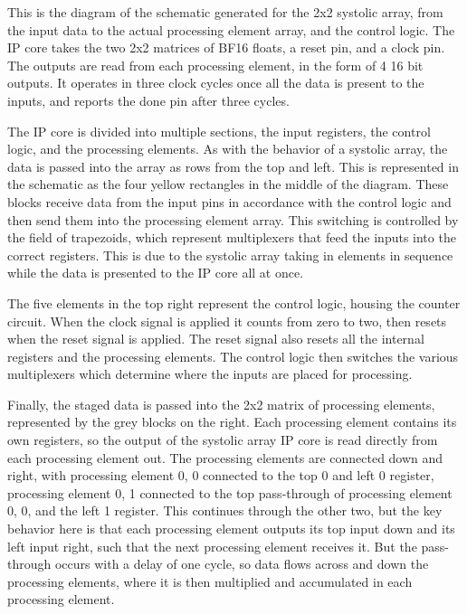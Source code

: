 \documentclass[12pt,letterpaper]{article}
\begin{document}
This is the diagram of the schematic generated for the 2x2 systolic array, from the input data to the actual processing element array, and the control logic.  The IP core takes the two 2x2 matrices of BF16 floats, a reset pin, and a clock pin.  The outputs are read from each processing element, in the form of 4 16 bit outputs.  It operates in three clock cycles once all the data is present to the inputs, and reports the done pin after three cycles.  

The IP core is divided into multiple sections, the input registers, the control logic, and the processing elements.  As with the behavior of a systolic array, the data is passed into the array as rows from the top and left.  This is represented in the schematic as the four yellow rectangles in the middle of the diagram.  These blocks receive data from the input pins in accordance with the control logic and then send them into the processing element array.  This switching is controlled by the field of trapezoids, which represent multiplexers that feed the inputs into the correct registers.  This is due to the systolic array taking in elements in sequence while the data is presented to the IP core all at once.  

The five elements in the top right represent the control logic, housing the counter circuit.  When the clock signal is applied it counts from zero to two, then resets when the reset signal is applied.  The reset signal also resets all the internal registers and the processing elements.  The control logic then switches the various multiplexers which determine where the inputs are placed for processing.

Finally, the staged data is passed into the 2x2 matrix of processing elements, represented by the grey blocks on the right.  Each processing element contains its own registers, so the output of the systolic array IP core is read directly from each processing element out.  The processing elements are connected down and right, with processing element 0, 0 connected to the top 0 and left 0 register, processing element 0, 1 connected to the top pass-through of processing element 0, 0, and the left 1 register.  This continues through the other two, but the key behavior here is that each processing element outputs its top input down and its left input right, such that the next processing element receives it.  But the pass-through occurs with a delay of one cycle, so data flows across and down the processing elements, where it is then multiplied and accumulated in each processing element.
\end{document}
